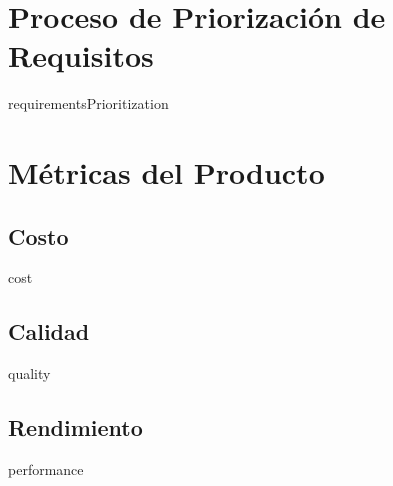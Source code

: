 \documentclass{article}
\begin{document}
    \section{Proceso de Priorización de Requisitos}
    {{requirementsPrioritization}}
    
    \section{Métricas del Producto}
    \subsection{Costo}
    {{cost}}
    \subsection{Calidad}
    {{quality}}
    \subsection{Rendimiento}
    {{performance}}
\end{document}
